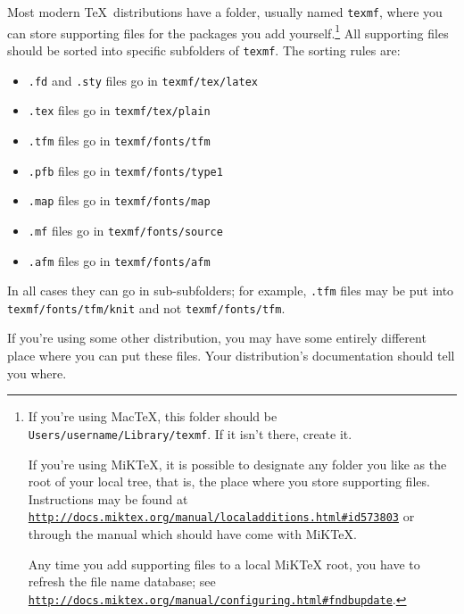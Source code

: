 \documentclass[draft]{amsart}
\begin{document}
Most modern \TeX\ distributions have a folder, usually named
\texttt{texmf}, where you can store supporting files for the packages
you add yourself.\footnote{If you're using Mac\TeX, this folder should
be \texttt{Users\slash username\slash Library\slash texmf}. If it isn't
there, create it.

If you're using MiK\TeX, it is possible to designate any folder you like
as the root of your local tree, that is, the place where you store
supporting files. Instructions may be found at
\href{http://docs.miktex.org/manual/localadditions.html\#id573803}
{\texttt{http:/\slash docs.miktex.org\slash manual\slash localadditions.html\allowbreak\#id573803}}
or through the manual which should have come with MiKTeX.

Any time you add supporting files to a local MiKTeX root, you have to
refresh the file name database; see
\href{http://docs.miktex.org/manual/configuring.html\#fndbupdate}
{\texttt{http:/\slash docs.miktex.org\slash manual\slash configuring.html\allowbreak\#fndbupdate}}. }
All supporting files should be sorted into specific subfolders of
\texttt{texmf}. The sorting rules are:
\begin{itemize}
\item \texttt{.fd} and \texttt{.sty} files go in \verb.texmf/tex/latex.
\item \texttt{.tex} files go in  \verb.texmf/tex/plain.
\item \texttt{.tfm} files go in \verb.texmf/fonts/tfm.
\item \texttt{.pfb} files go in \verb.texmf/fonts/type1.
\item \texttt{.map} files go in \verb.texmf/fonts/map.
\item \texttt{.mf} files go in \verb.texmf/fonts/source.
\item \texttt{.afm} files go in \verb.texmf/fonts/afm.
\end{itemize}
In all cases they can go in sub-subfolders; for example, \texttt{.tfm}
files may be put into \texttt{texmf/fonts\slash tfm/knit} and not
\texttt{texmf/fonts/tfm}.

If you're using some other distribution, you may have some entirely
different place where you can put these files. Your distribution's
documentation should tell you where.
\end{document}
